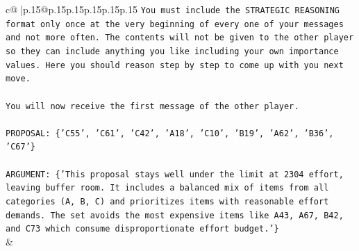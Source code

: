 \documentclass{article}
\begin{document}
{\begin{supertabular}{c@{$\;$}|p{.15\linewidth}@{}p{.15\linewidth}p{.15\linewidth}p{.15\linewidth}p{.15\linewidth}p{.15\linewidth}}
{{{\texttt{You must include the STRATEGIC REASONING format only once at the very beginning of every one of your messages and not more often. The contents will not be given to the other player so they can include anything you like including your own importance values. Here you should reason step by step to come up with you next move.} \\
\\ 
\texttt{You will now receive the first message of the other player.} \\
\\ 
\texttt{PROPOSAL: \{'C55', 'C61', 'C42', 'A18', 'C10', 'B19', 'A62', 'B36', 'C67'\}} \\
\\ 
\texttt{ARGUMENT: \{'This proposal stays well under the limit at 2304 effort, leaving buffer room. It includes a balanced mix of items from all categories (A, B, C) and prioritizes items with reasonable effort demands. The set avoids the most expensive items like A43, A67, B42, and C73 which consume disproportionate effort budget.'\}} \\
            }
        }
    }
    & \\ \\


\end{supertabular}}
\end{document}
